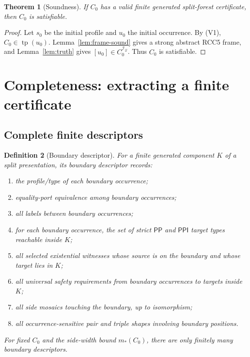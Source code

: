 \documentclass[11pt]{article}
\newtheorem{theorem}{Theorem}[section]
\newtheorem{definition}[theorem]{Definition}
\newcommand{\PP}{\mathsf{PP}}
\newcommand{\PPI}{\mathsf{PPI}}
\newcommand{\I}{\mathcal I}
\newcommand{\Q}{\mathcal Q}
\newcommand{\typ}{\operatorname{tp}}
\begin{document}
\begin{theorem}[Soundness]\label{thm:soundness}
If $C_0$ has a valid finite generated split-forest certificate, then $C_0$ is satisfiable.
\end{theorem}

\begin{proof}
Let $s_0$ be the initial profile and $u_0$ the initial occurrence.  By (V1), $C_0\in\typ(u_0)$.  Lemma~\ref{lem:frame-sound} gives a strong abstract RCC5 frame, and Lemma~\ref{lem:truth} gives $[u_0]\in C_0^{\I_\Q}$.  Thus $C_0$ is satisfiable.
\end{proof}

\section{Completeness: extracting a finite certificate}

\subsection{Complete finite descriptors}

\begin{definition}[Boundary descriptor]\label{def:boundary-descriptor}
For a finite generated component $K$ of a split presentation, its boundary descriptor records:
\begin{enumerate}[label=(D\arabic*)]
\item the profile/type of each boundary occurrence;
\item equality-port equivalence among boundary occurrences;
\item all labels between boundary occurrences;
\item for each boundary occurrence, the set of strict $\PP$ and $\PPI$ target types reachable inside $K$;
\item all selected existential witnesses whose source is on the boundary and whose target lies in $K$;
\item all universal safety requirements from boundary occurrences to targets inside $K$;
\item all side mosaics touching the boundary, up to isomorphism;
\item all occurrence-sensitive pair and triple shapes involving boundary positions.
\end{enumerate}
For fixed $C_0$ and the side-width bound $m_*(C_0)$, there are only finitely many boundary descriptors.
\end{definition}
\end{document}
